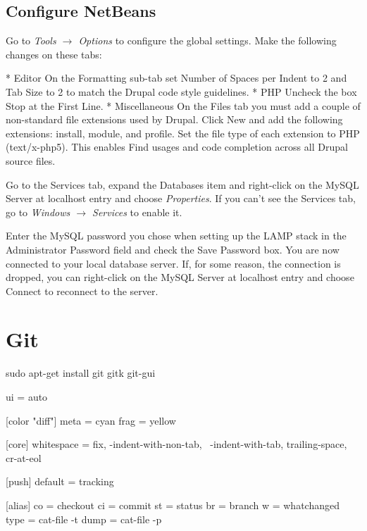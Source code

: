 \documentclass[draft,ebook,10pt,twoside,openright]{memoir}
\begin{document}
\subsection{Configure NetBeans}

Go to \emph{Tools $\rightarrow$ Options} to configure the global settings. Make the following changes on these tabs:

    * Editor On the Formatting sub-tab set Number of Spaces per Indent to 2 and Tab Size to 2 to match the Drupal code style guidelines.
    * PHP Uncheck the box Stop at the First Line.
    * Miscellaneous On the Files tab you must add a couple of non-standard file extensions used by Drupal. Click New and add the following extensions: install, module, and profile. Set the file type of each extension to PHP (text/x-php5). This enables Find usages and code completion across all Drupal source files.

Go to the Services tab, expand the Databases item and right-click on the MySQL Server at localhost entry and choose \emph{Properties}. If you can’t see the Services tab, go to \emph{Windows $\rightarrow$ Services} to enable it.

Enter the MySQL password you chose when setting up the LAMP stack in the Administrator Password field and check the Save Password box. You are now connected to your local database server. If, for some reason, the connection is dropped, you can right-click on the MySQL Server at localhost entry and choose Connect to reconnect to the server.

\section{Git}

\begin{squashboxcommand}
sudo apt-get install git gitk git-gui
\end{squashboxcommand}

\begin{squashboxoutput}
[color]
ui = auto

[color "diff"]
meta = cyan
frag = yellow

[core]
whitespace = fix, -indent-with-non-tab, \
  -indent-with-tab, trailing-space, cr-at-eol

[push]
default = tracking

[alias]
co = checkout
ci = commit
st = status
br = branch
w = whatchanged
type = cat-file -t
dump = cat-file -p
\end{squashboxoutput}
\end{document}
